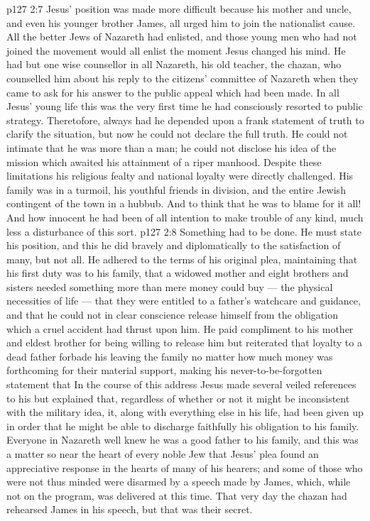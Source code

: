 \vs p127 2:7 Jesus’ position was made more difficult because his mother and uncle, and even his younger brother James, all urged him to join the nationalist cause. All the better Jews of Nazareth had enlisted, and those young men who had not joined the movement would all enlist the moment Jesus changed his mind. He had but one wise counsellor in all Nazareth, his old teacher, the chazan, who counselled him about his reply to the citizens’ committee of Nazareth when they came to ask for his answer to the public appeal which had been made. In all Jesus’ young life this was the very first time he had consciously resorted to public strategy. Theretofore, always had he depended upon a frank statement of truth to clarify the situation, but now he could not declare the full truth. He could not intimate that he was more than a man; he could not disclose his idea of the mission which awaited his attainment of a riper manhood. Despite these limitations his religious fealty and national loyalty were directly challenged. His family was in a turmoil, his youthful friends in division, and the entire Jewish contingent of the town in a hubbub. And to think that he was to blame for it all! And how innocent he had been of all intention to make trouble of any kind, much less a disturbance of this sort.
\vs p127 2:8 Something had to be done. He must state his position, and this he did bravely and diplomatically to the satisfaction of many, but not all. He adhered to the terms of his original plea, maintaining that his first duty was to his family, that a widowed mother and eight brothers and sisters needed something more than mere money could buy --- the physical necessities of life --- that they were entitled to a father’s watchcare and guidance, and that he could not in clear conscience release himself from the obligation which a cruel accident had thrust upon him. He paid compliment to his mother and eldest brother for being willing to release him but reiterated that loyalty to a dead father forbade his leaving the family no matter how much money was forthcoming for their material support, making his never\hyp{}to\hyp{}be\hyp{}forgotten statement that  In the course of this address Jesus made several veiled references to his  but explained that, regardless of whether or not it might be inconsistent with the military idea, it, along with everything else in his life, had been given up in order that he might be able to discharge faithfully his obligation to his family. Everyone in Nazareth well knew he was a good father to his family, and this was a matter so near the heart of every noble Jew that Jesus’ plea found an appreciative response in the hearts of many of his hearers; and some of those who were not thus minded were disarmed by a speech made by James, which, while not on the program, was delivered at this time. That very day the chazan had rehearsed James in his speech, but that was their secret.
